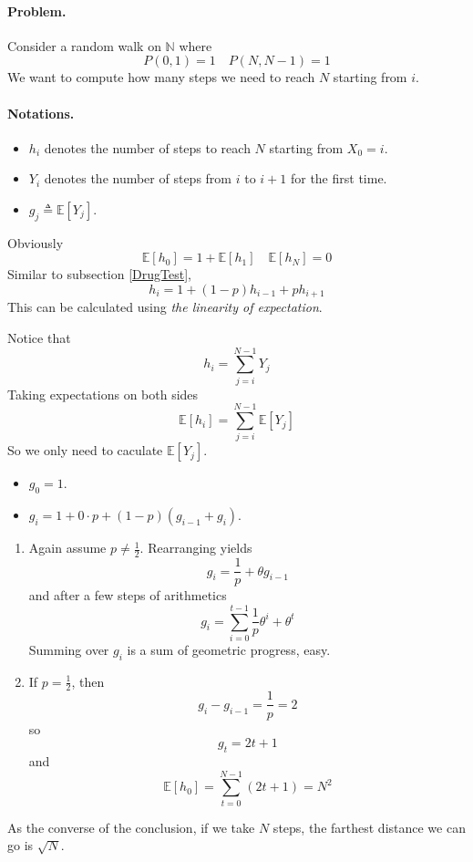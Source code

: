     \paragraph*{Problem.} Consider a random walk on $\mathbb{N}$ where
    \[ P(0,1) = 1 \quad P(N,N-1) = 1 \]
    We want to compute how many steps we need to reach $N$ starting from $i$.
    \paragraph*{Notations.}
    \begin{itemize}
        \item $h_i$ denotes the number of steps to reach $N$ starting from $X_0=i$.
        \item $Y_i$ denotes the number of steps from $i$ to $i+1$ for the first time.
        \item $g_j \triangleq \mathbb{E}[Y_j]$.
    \end{itemize}
    Obviously
    \[ \mathbb{E}[h_0] = 1 + \mathbb{E}[h_1] \quad \mathbb{E}[h_N] = 0 \]
    Similar to subsection \ref{DrugTest},
    \[ h_i = 1+ (1-p)h_{i-1} + ph_{i+1} \]
    This can be calculated using \emph{the linearity of expectation}. 

    Notice that
    \[ h_i = \sum_{j=i}^{N-1}Y_j \]
    Taking expectations on both sides
    \[ \mathbb{E}[h_i] = \sum_{j=i}^{N-1}\mathbb{E}[Y_j] \]
    So we only need to caculate $\mathbb{E}[Y_j]$.
    \begin{itemize}
        \item $g_0 = 1$.
        \item $g_i = 1 + 0 \cdot p + (1-p)(g_{i-1}+g_i)$.
    \end{itemize}
    \begin{enumerate}
        \item Again assume $p \neq \frac{1}{2}$. 
        Rearranging yields
        \[ g_i = \frac{1}{p} + \theta g_{i-1} \]
        and after a few steps of arithmetics
        \[ g_i = \sum_{i=0}^{t-1}\frac{1}{p}\theta^i + \theta^t \]
        Summing over $g_i$ is a sum of geometric progress, easy.
        \item If $p = \frac{1}{2}$, then
        \[ g_{i} - g_{i-1} = \frac{1}{p} = 2 \]
        so
        \[ g_t = 2t + 1 \]
        and
        \[ \mathbb{E}[h_0] = \sum_{t=0}^{N-1}(2t+1) = N^2 \]
    \end{enumerate}
    \begin{remark}
        As the converse of the conclusion, if we take $N$ steps, the farthest distance we can go is $\sqrt{N}$.
    \end{remark}



